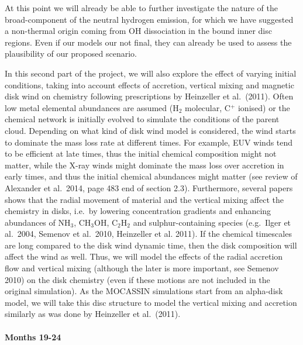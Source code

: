 \documentclass[10pt,fleqn,twoside]{article}
\begin{document}
At this point we will already be able to further investigate the nature of the broad-component of the neutral hydrogen emission, for which we have suggested a non-thermal origin coming from OH dissociation in the bound inner disc regions. Even if our models our not final, they can already be used to assess the plausibility of our proposed scenario.

In this second part of the project, we will also explore the effect of
varying initial conditions, taking into account effects of accretion,
vertical mixing and magnetic disk wind on chemistry following
prescriptions by Heinzeller et al.\ (2011). Often low metal elemental
abundances are assumed (H$_2$ molecular, C$^+$ ionised) or the
chemical network is initially evolved to simulate the conditions of
the parent cloud.  Depending on what kind of disk wind model is
considered, the wind starts to dominate the mass loss rate at
different times. For example, EUV winds tend to be efficient at late
times, thus the initial chemical composition might not matter, while
the X-ray winds might dominate the mass loss over accretion in early
times, and thus the initial chemical abundances might matter (see
review of Alexander et al.\ 2014, page 483 end of section
2.3). Furthermore, several papers shows that the radial movement of
material and the vertical mixing affect the chemistry in disks,
i.e.\ by lowering concentration gradients and enhancing abundances of
NH$_3$, CH$_3$OH, C$_2$H$_2$ and sulphur-containing species
(e.g.\ Ilger et al.\ 2004, Semenov et al.\ 2010, Heinzeller et
al. 2011). If the chemical timescales are long compared to the disk
wind dynamic time, then the disk composition will affect the wind as
well. Thus, we will model the effects of the radial accretion flow and
vertical mixing (although the later is more important, see Semenov
2010) on the disk chemistry (even if these motions are not included in
the original simulation). As the MOCASSIN simulations start from an
alpha-disk model, we will take this disc structure to model the
vertical mixing and accretion similarly as was done by Heinzeller et
al.\ (2011). 

\paragraph{ Months 19-24}
\end{document}
